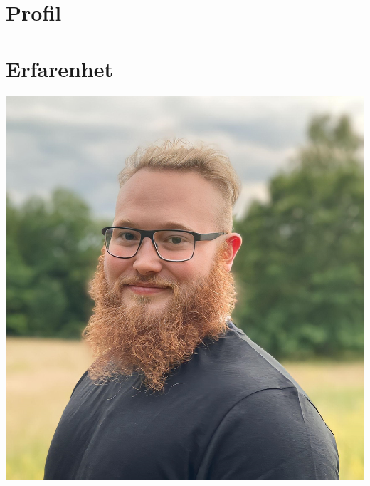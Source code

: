 \documentclass{article}
\begin{document}
	\noindent
	\begin{minipage}[t]{0.7\textwidth}
		\vspace{-20pt} %
		\section*{\textcolor{colorBlue}{Profil}}
		
			\section*{\textcolor{colorBlue}{Erfarenhet}}
		
		\vspace{10pt} %
		
	\end{minipage}%
	\hfill
	\begin{minipage}[t]{0.28\textwidth}
		\begin{minipage}[t]{0.8\textwidth}
			\vspace{-140pt} %
			\includegraphics[width=\linewidth]{../../me.png}
			\label{fig:bild}
		\end{minipage}
		\vspace{-10pt} %

\end{minipage}
\end{document}
